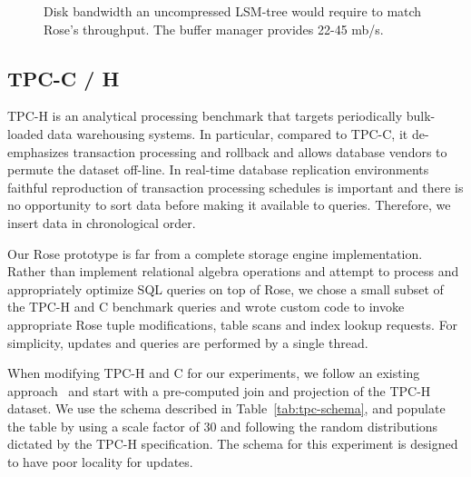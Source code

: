 \documentclass{vldb}
\newcommand{\rows}{Rose\xspace}
\newcommand{\rowss}{Rose's\xspace}
\begin{document}



\begin{figure}
\centering
{}
\caption{Disk bandwidth an uncompressed LSM-tree would
  require to match \rowss throughput.  The buffer manager provides
  22-45 mb/s.}
\label{fig:4R}
\end{figure}

\subsection{TPC-C / H}

TPC-H is an analytical processing benchmark that targets periodically
bulk-loaded data warehousing systems.  In particular, compared to
TPC-C, it de-emphasizes transaction processing and rollback and
allows database vendors to permute the dataset off-line.  In real-time
database replication environments faithful reproduction of
transaction processing schedules is important and there is no
opportunity to sort data before making it available to queries.
Therefore, we insert data in chronological order.

Our \rows prototype is far from a complete storage engine
implementation.  Rather than implement relational algebra operations
and attempt to process and appropriately optimize SQL queries on top
of \rows, we chose a small subset of the TPC-H and C benchmark
queries and wrote custom code to invoke appropriate \rows tuple
modifications, table scans and index lookup requests.  For simplicity,
updates and queries are performed by a single thread.

When modifying TPC-H and C for our experiments, we follow an existing
approach~\cite{entropy,bitsForChronos} and start with a pre-computed
join and projection of the TPC-H dataset.  We use the schema described
in Table~\ref{tab:tpc-schema}, and populate the table by using a scale
factor of 30 and following the random distributions dictated by the
TPC-H specification.  The schema for this experiment is designed to
have poor locality for updates.
\end{document}
